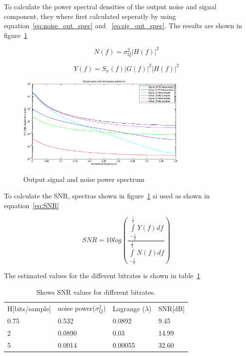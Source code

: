 	To calculate the power spectral densities of the output noise and signal component, they where first calculated seperatly by using equation~\ref{eq:noise_out_spec} and ~\ref{eq:sig_out_spec}. The results are shown in figure~\ref{fig:sig_noise_freq_out}
	
	\begin{equation}
		N(f)=\sigma _Q^2|H(f)|^2
		\label{eq:noise_out_spec}
	\end{equation}
	
	\begin{equation}
		Y(f)=S_x(f)|G(f)|^2|H(f)|^2
		\label{eq:sig_out_spec}
	\end{equation}
	
	
	\begin{figure}[H]
	  \centering
	  \includegraphics[width=0.75\textwidth]{img/Oppgave2a_sig_noise_freq_out}
	  \label{fig:sig_noise_freq_out}
	  \caption{Output signal and noise power spectrum}
	\end{figure}
	
	To calculate the SNR, spectras shown in  figure~\ref{fig:sig_noise_freq_out} si used as shown in equation~\ref{eq:SNR}
	
	\begin{equation}
		SNR=10log\left(\frac{\int\limits_{-\frac{1}{2}}^{\frac{1}{2}}Y(f)df}{\int\limits_{-\frac{1}{2}}^{\frac{1}{2}}N(f)df}\right)
		\label{eq:SNR}
	\end{equation}
	
	The estimated values for the different bitrates is shown in table~\ref{tab:SNR_results}
	
	\begin{table}[H]
		\centering
		\begin{tabular}{l l l l}
			H[bits/sample] & noise power($\sigma^2_Q$) & Lagrange ($\lambda$) & SNR[dB] \\
			0.75 & 0.532 & 0.0892 & 9.45 \\
			2 & 0.0890 & 0.03 & 14.99 \\
			5 & 0.0014 & 0.00055 & 32.60 \\
		\end{tabular}
		\label{tab:SNR_results}
		\caption{Shows SNR values for different bitrates.}
	\end{table}

